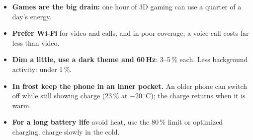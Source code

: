 \begin{keybox}
\begin{itemize}
  \item \textbf{Games are the big drain:} one hour of 3D gaming can use a quarter of a day's energy.
  \item \textbf{Prefer Wi-Fi} for video and calls, and in poor coverage; a voice call costs far less than video.
  \item \textbf{Dim a little, use a dark theme and 60\,Hz}: 3--5\,\% each. Less background activity: under 1\,\%.
  \item \textbf{In frost keep the phone in an inner pocket.} An older phone can switch off while still showing
  charge (23\,\% at $-20\,^\circ$C); the charge returns when it is warm.
  \item \textbf{For a long battery life} avoid heat, use the 80\,\% limit or optimized charging, charge
  slowly in the cold.
\end{itemize}
\end{keybox}
